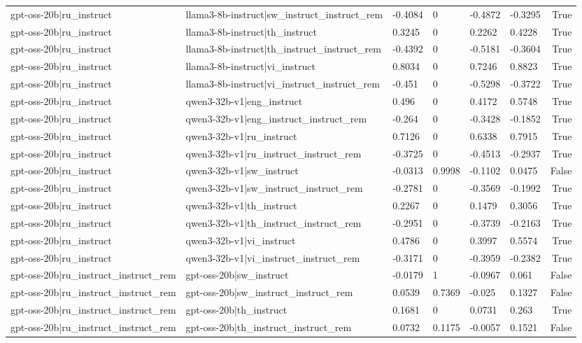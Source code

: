 \begin{table}
\begin{tabular}{llllllr}
gpt-oss-20b|ru_instruct & llama3-8b-instruct|sw_instruct_instruct_rem & -0.4084 & 0 & -0.4872 & -0.3295 & True \\
gpt-oss-20b|ru_instruct & llama3-8b-instruct|th_instruct & 0.3245 & 0 & 0.2262 & 0.4228 & True \\
gpt-oss-20b|ru_instruct & llama3-8b-instruct|th_instruct_instruct_rem & -0.4392 & 0 & -0.5181 & -0.3604 & True \\
gpt-oss-20b|ru_instruct & llama3-8b-instruct|vi_instruct & 0.8034 & 0 & 0.7246 & 0.8823 & True \\
gpt-oss-20b|ru_instruct & llama3-8b-instruct|vi_instruct_instruct_rem & -0.451 & 0 & -0.5298 & -0.3722 & True \\
gpt-oss-20b|ru_instruct & qwen3-32b-v1|eng_instruct & 0.496 & 0 & 0.4172 & 0.5748 & True \\
gpt-oss-20b|ru_instruct & qwen3-32b-v1|eng_instruct_instruct_rem & -0.264 & 0 & -0.3428 & -0.1852 & True \\
gpt-oss-20b|ru_instruct & qwen3-32b-v1|ru_instruct & 0.7126 & 0 & 0.6338 & 0.7915 & True \\
gpt-oss-20b|ru_instruct & qwen3-32b-v1|ru_instruct_instruct_rem & -0.3725 & 0 & -0.4513 & -0.2937 & True \\
gpt-oss-20b|ru_instruct & qwen3-32b-v1|sw_instruct & -0.0313 & 0.9998 & -0.1102 & 0.0475 & False \\
gpt-oss-20b|ru_instruct & qwen3-32b-v1|sw_instruct_instruct_rem & -0.2781 & 0 & -0.3569 & -0.1992 & True \\
gpt-oss-20b|ru_instruct & qwen3-32b-v1|th_instruct & 0.2267 & 0 & 0.1479 & 0.3056 & True \\
gpt-oss-20b|ru_instruct & qwen3-32b-v1|th_instruct_instruct_rem & -0.2951 & 0 & -0.3739 & -0.2163 & True \\
gpt-oss-20b|ru_instruct & qwen3-32b-v1|vi_instruct & 0.4786 & 0 & 0.3997 & 0.5574 & True \\
gpt-oss-20b|ru_instruct & qwen3-32b-v1|vi_instruct_instruct_rem & -0.3171 & 0 & -0.3959 & -0.2382 & True \\
gpt-oss-20b|ru_instruct_instruct_rem & gpt-oss-20b|sw_instruct & -0.0179 & 1 & -0.0967 & 0.061 & False \\
gpt-oss-20b|ru_instruct_instruct_rem & gpt-oss-20b|sw_instruct_instruct_rem & 0.0539 & 0.7369 & -0.025 & 0.1327 & False \\
gpt-oss-20b|ru_instruct_instruct_rem & gpt-oss-20b|th_instruct & 0.1681 & 0 & 0.0731 & 0.263 & True \\
gpt-oss-20b|ru_instruct_instruct_rem & gpt-oss-20b|th_instruct_instruct_rem & 0.0732 & 0.1175 & -0.0057 & 0.1521 & False \\

\end{tabular}
\end{table}

